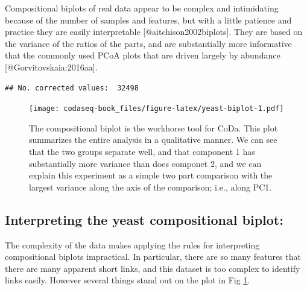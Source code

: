 \documentclass[
  onecolumn]{article}
\begin{document}
Compositional biplots of real data appear to be complex and intimidating because of the number of samples and features, but with a little patience and practice they are easily interpretable {[}@aitchison2002biplots{]}. They are based on the variance of the ratios of the parts, and are substantially more informative that the commonly used PCoA plots that are driven largely by abundance {[}@Gorvitovskaia:2016aa{]}.

\begin{verbatim}
## No. corrected values:  32498
\end{verbatim}

\begin{figure}
\centering
\texttt{[image: codaseq-book\_files/figure-latex/yeast-biplot-1.pdf]}
\caption{\label{fig:yeast-biplot}The compositional biplot is the workhorse tool for CoDa. This plot summarizes the entire analysis in a qualitative manner. We can see that the two groups separate well, and that component 1 has substantially more variance than does componet 2, and we can explain this experiment as a simple two part comparison with the largest variance along the axis of the comparison; i.e., along PC1.}
\end{figure}

\hypertarget{interpreting-the-yeast-compositional-biplot}{%
\subsection{Interpreting the yeast compositional biplot:}\label{interpreting-the-yeast-compositional-biplot}}

The complexity of the data makes applying the rules for interpreting compositional biplots impractical. In particular, there are so many features that there are many apparent short links, and this dataset is too complex to identify links easily. However several things stand out on the plot in Fig \ref{fig:yeast-biplot}.
\end{document}
